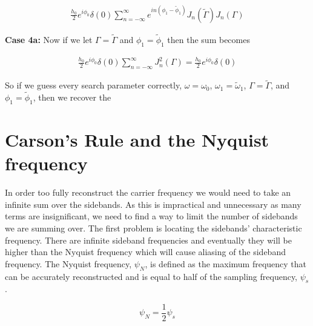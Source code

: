 \documentclass[onecolumn, groupedaddress, 10pt]{revtex4-1}
\begin{document}
\begin{align}
\frac{h_0}{2} e^{i\phi_0} \delta(0) \sum_{n=-\infty}^{\infty} e^{in(\phi_1-\widetilde{\phi}_1)} J_n(\widetilde{\Gamma}) J_n (\Gamma)
\end{align}

\textbf{Case 4a:} Now if we let $\Gamma = \widetilde{\Gamma}$ and $\phi_1 = \widetilde{\phi}_1$ then the sum becomes

\begin{align}
\frac{h_0}{2} e^{i\phi_0} \delta(0) \sum_{n=-\infty}^{\infty} J_n^2 (\Gamma) = \frac{h_0}{2} e^{i\phi_0} \delta(0)
\end{align}

So if we guess every search parameter correctly, $\omega = \omega_0$, $\omega_1 = \widetilde{\omega}_1$, $\Gamma = \widetilde{\Gamma}$, and $\phi_1 = \widetilde{\phi}_1$, then we recover the 







\section{Carson's Rule and the Nyquist frequency}
In order too fully reconstruct the carrier frequency we would need to take an infinite sum over the sidebands. As this is impractical and unnecessary as many terms are insignificant, we need to find a way to limit the number of sidebands we are summing over. The first problem is locating the sidebands' characteristic frequency. There are infinite sideband frequencies and eventually they will be higher than the Nyquist frequency which will cause aliasing of the sideband frequency. The Nyquist frequency, $\psi_N$, is defined as the maximum frequency that can be accurately reconstructed and is equal to half of the sampling frequency, $\psi_s$.

\begin{equation}
\psi_N = \frac{1}{2}\psi_s
\end{equation}
\end{document}
